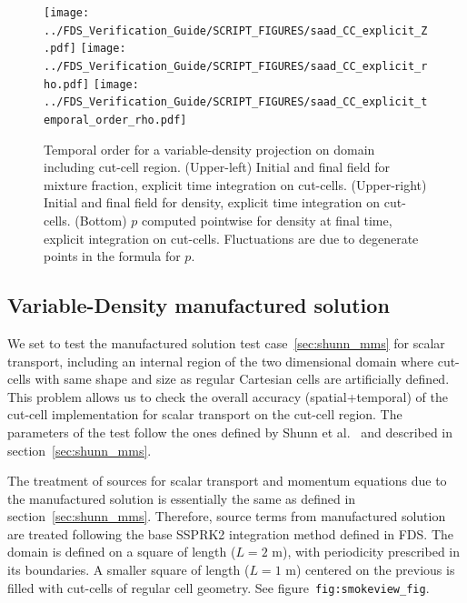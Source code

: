 \documentclass[11pt]{book}
\begin{document}
\begin{figure}[ht]
\centering
\texttt{[image: ../FDS\_Verification\_Guide/SCRIPT\_FIGURES/saad\_CC\_explicit\_Z.pdf]}
\texttt{[image: ../FDS\_Verification\_Guide/SCRIPT\_FIGURES/saad\_CC\_explicit\_rho.pdf]}
\texttt{[image: ../FDS\_Verification\_Guide/SCRIPT\_FIGURES/saad\_CC\_explicit\_temporal\_order\_rho.pdf]}
\caption[The {\ct saad CC} temporal order test case]{Temporal order for a variable-density projection on domain including cut-cell region.  (Upper-left) Initial and final field for mixture fraction, explicit time integration on cut-cells.  (Upper-right) Initial and final field for density, explicit time integration on cut-cells.  (Bottom) $p$ computed pointwise for density at final time, explicit integration on cut-cells. Fluctuations are due to degenerate points in the formula for $p$.}\label{fig:saad_cc_temporal_order}
\end{figure}


\subsection{Variable-Density manufactured solution}

\label{sec:shunn_cc_mms}


We set to test the manufactured solution test case~\ref{sec:shunn_mms} for scalar transport, including an internal region of the two dimensional domain where cut-cells with same shape and size as regular Cartesian cells are artificially defined. This problem allows us to check the overall accuracy (spatial+temporal) of the cut-cell implementation for scalar transport on the cut-cell region.
The parameters of the test follow the ones defined by Shunn et al.~\cite{Shunn:2012} and described in section~\ref{sec:shunn_mms}.

The treatment of sources for scalar transport and momentum equations due to the manufactured solution is essentially the same as defined in section~\ref{sec:shunn_mms}. Therefore, source terms from manufactured solution are treated following the base SSPRK2 integration method defined in FDS.
The domain is defined on a square of length ($L=2$ m), with periodicity prescribed in its boundaries. A smaller square of length ($L=1$ m) centered on the previous is filled with cut-cells of regular cell geometry. See figure~\texttt{fig:smokeview\_fig}.


\end{document}
